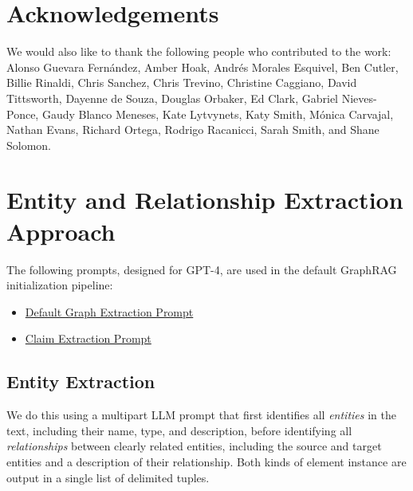 \documentclass{article}
\begin{document}
\section*{Acknowledgements}
We would also like to thank the following people who contributed to the work: Alonso Guevara Fernández, Amber Hoak, Andrés Morales Esquivel, Ben Cutler, Billie Rinaldi, Chris Sanchez, Chris Trevino, Christine Caggiano, David Tittsworth, Dayenne de Souza, Douglas Orbaker, Ed Clark, Gabriel Nieves-Ponce, Gaudy Blanco Meneses, Kate Lytvynets, Katy Smith, Mónica Carvajal, Nathan Evans, Richard Ortega, Rodrigo Racanicci, Sarah Smith, and Shane Solomon. 


\medskip



\appendix

\newpage

\pagebreak
\section{Entity and Relationship Extraction Approach}
\label{app:prompts}

The following prompts, designed for GPT-4, are used in the default GraphRAG initialization pipeline:
\begin{itemize}
\item \href{https://github.com/microsoft/graphrag/blob/6d21ef268377e319a165ca2250bd6841737df1ad/graphrag/prompts/index/entity_extraction.py#L6}{Default Graph Extraction Prompt}
\item \href{https://github.com/microsoft/graphrag/blob/6d21ef268377e319a165ca2250bd6841737df1ad/graphrag/prompts/index/claim_extraction.py#L1}{Claim Extraction Prompt}
\end{itemize}

\subsection{Entity Extraction}
\label{app:entity}
We do this using a multipart LLM prompt that first identifies all \emph{entities} in the text, including their name, type, and description, before identifying all \emph{relationships} between clearly related entities, including the source and target entities and a description of their relationship. Both kinds of element instance are output in a single list of delimited tuples.
\end{document}

